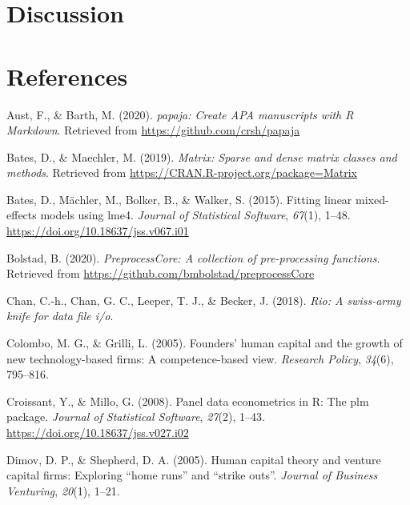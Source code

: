 \documentclass[
  english,
  man]{apa6}
\begin{document}
\hypertarget{discussion}{%
\section{Discussion}\label{discussion}}

\newpage

\hypertarget{references}{%
\section{References}\label{references}}

\begingroup
\setlength{\parindent}{-0.5in}
\setlength{\leftskip}{0.5in}

\hypertarget{refs}{}
\leavevmode\hypertarget{ref-R-papaja}{}%
Aust, F., \& Barth, M. (2020). \emph{papaja: Create APA manuscripts with R Markdown}. Retrieved from \url{https://github.com/crsh/papaja}

\leavevmode\hypertarget{ref-R-Matrix}{}%
Bates, D., \& Maechler, M. (2019). \emph{Matrix: Sparse and dense matrix classes and methods}. Retrieved from \url{https://CRAN.R-project.org/package=Matrix}

\leavevmode\hypertarget{ref-R-lme4}{}%
Bates, D., Mächler, M., Bolker, B., \& Walker, S. (2015). Fitting linear mixed-effects models using lme4. \emph{Journal of Statistical Software}, \emph{67}(1), 1--48. \url{https://doi.org/10.18637/jss.v067.i01}

\leavevmode\hypertarget{ref-R-preprocessCore}{}%
Bolstad, B. (2020). \emph{PreprocessCore: A collection of pre-processing functions}. Retrieved from \url{https://github.com/bmbolstad/preprocessCore}

\leavevmode\hypertarget{ref-R-rio}{}%
Chan, C.-h., Chan, G. C., Leeper, T. J., \& Becker, J. (2018). \emph{Rio: A swiss-army knife for data file i/o}.

\leavevmode\hypertarget{ref-colombo2005founders}{}%
Colombo, M. G., \& Grilli, L. (2005). Founders' human capital and the growth of new technology-based firms: A competence-based view. \emph{Research Policy}, \emph{34}(6), 795--816.

\leavevmode\hypertarget{ref-R-plm_a}{}%
Croissant, Y., \& Millo, G. (2008). Panel data econometrics in R: The plm package. \emph{Journal of Statistical Software}, \emph{27}(2), 1--43. \url{https://doi.org/10.18637/jss.v027.i02}

\leavevmode\hypertarget{ref-dimov2005human}{}%
Dimov, D. P., \& Shepherd, D. A. (2005). Human capital theory and venture capital firms: Exploring ``home runs'' and ``strike outs''. \emph{Journal of Business Venturing}, \emph{20}(1), 1--21.
\end{document}
